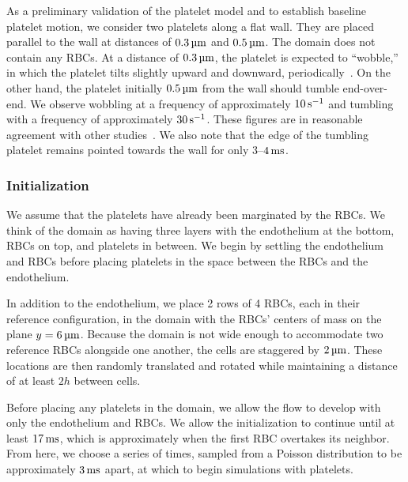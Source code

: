 As a preliminary validation of the platelet model and to establish baseline platelet motion, we consider two
platelets along a flat wall. They are placed parallel to the wall at distances of $0.3\um$ and $0.5\um$. The
domain does not contain any RBCs. At a distance of $0.3\um$, the platelet is expected to ``wobble\qend,'' in which
the platelet tilts slightly upward and downward, periodically~\cite{King:2005fv}. On the other hand, the platelet
initially $0.5\um$ from the wall should tumble end-over-end. We observe wobbling at a frequency of approximately
$10\persec$ and tumbling with a frequency of approximately $30\persec$. These figures are in reasonable agreement
with other studies~\cite{King:2005fv}. We also note that the edge of the tumbling platelet remains pointed towards
the wall for only 3--$4\ms$.

\subsubsection{Initialization}\label{sec:blood-init}

We assume that the platelets have already been marginated by the RBCs. We think of the domain as having three
layers with the endothelium at the bottom, RBCs on top, and platelets in between. We begin by settling the
endothelium and RBCs before placing platelets in the space between the RBCs and the endothelium.

In addition to the endothelium, we place 2 rows of 4 RBCs, each in their reference configuration, in the domain
with the RBCs' centers of mass on the plane $y=6\um$.  Because the domain is not wide enough to accommodate two
reference RBCs alongside one another, the cells are staggered by $2\um$. These locations are then randomly
translated and rotated while maintaining a distance of at least $2h$ between cells.

Before placing any platelets in the domain, we allow the flow to develop with only the endothelium and RBCs. We
allow the initialization to continue until at least $17\ms$, which is approximately when the first RBC overtakes
its neighbor. From here, we choose a series of times, sampled from a Poisson distribution to be approximately
$3\ms$ apart, at which to begin simulations with platelets.

